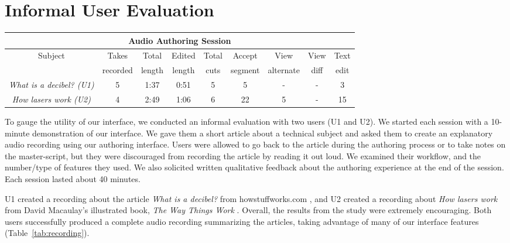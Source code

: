 \section{Informal User Evaluation}

\begin{table*}[ht]
\center
{}

\begin{tabular}{c|cccccccc}
\multicolumn{9}{c}{\textbf{Audio Authoring Session}}\\\hline
{Subject}&{Takes} &{Total}&{Edited} & {Total} & {Accept}
&{View}&{View}&{Text} \\
{}&{recorded}&{length}&{length}&{cuts}&{segment}&{alternate}&{diff}&{edit} \\\hline
\textit{What is a decibel? (U1)}&{5}&{1:37}&{0:51}& {5}&{5} &{-}&{-}&{3}\\
\textit{How lasers work (U2)}  &{4}&{2:49}&{1:06}&{6}&{22}&{5}&{-}&{15}
\\\hline
\end{tabular} 
\label{tab:recording}
\caption{Two users (\textit{U1} and \textit{U2}) created audio recordings using our system and we collected their usage statistics. Total cuts refer to the number of places where audio segments from different takes were joined together. View alternate refers to the number of times users viewed alterantive takes of a segment in  \textit{all-tab} using a drop-down button.}
\end{table*}
To gauge the utility of our interface, we conducted an informal evaluation with two users (U1 and U2). We started each session with a 10-minute demonstration of our interface. We gave them a short article about a technical subject and asked them to create an explanatory audio recording using our authoring interface. Users were allowed to go back to the article during the authoring process or to take notes on the master-script, but they were discouraged from recording the article by reading it out loud. We examined their workflow, and the number/type of features they used. We also solicited written qualitative feedback about the authoring experience at the end of the session. Each session lasted about 40 minutes.

U1 created a recording about the article \textit{What is a decibel? } from howstuffworks.com \cite{howstuffworks}, and U2 created a recording about \textit{How lasers work} from David Macaulay's illustrated book, \textit{The Way Things Work} \cite{macaulay1999way}. Overall, the results from the study were extremely encouraging. Both users successfully produced a complete audio recording summarizing the articles, taking advantage of many of our interface features (Table~\ref{tab:recording}). 




